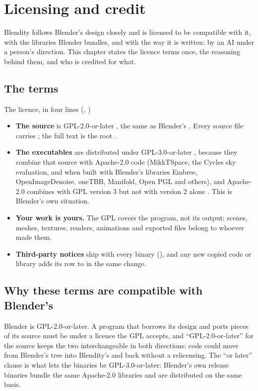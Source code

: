 \chapter{Licensing and credit}
\label{ch:licensing}
Blendity follows Blender's design closely and is licensed to be compatible with it, with the libraries Blender bundles,
and with the way it is written: by an AI under a person's direction. This chapter states the licence terms once, the
reasoning behind them, and who is credited for what.

\section{The terms}
\begin{rulebox}{The licence, in four lines (, )}
\begin{itemize}
  \item \textbf{The source} is GPL-2.0-or-later \cite{GPLv2}, the same as Blender's \cite{Blender2026}. Every source file
    carries  \cite{SPDX2024}; the full text is the root .
  \item \textbf{The executables} are distributed under GPL-3.0-or-later \cite{GPLv3}, because they combine that source
    with Apache-2.0 code \cite{Apache2} (MikkTSpace, the Cycles sky evaluation, and when built with Blender's libraries
    Embree, OpenImageDenoise, oneTBB, Manifold, Open PGL and others), and Apache-2.0 combines with GPL version 3 but
    not with version 2 alone \cite{GPLFAQ2026}. This is Blender's own situation.
  \item \textbf{Your work is yours.} The GPL covers the program, not its output: scenes, meshes, textures, renders,
    animations and exported files belong to whoever made them.
  \item \textbf{Third-party notices} ship with every binary (), and any new copied code or library adds
    its row to  in the same change.
\end{itemize}
\end{rulebox}

\section{Why these terms are compatible with Blender's}
Blender is GPL-2.0-or-later. A program that borrows its design and ports pieces of its source must be under a licence
the GPL accepts, and ``GPL-2.0-or-later'' for the source keeps the two interchangeable in both directions: code could
move from Blender's tree into Blendity's and back without a relicensing. The ``or later'' clause is what lets the
binaries be GPL-3.0-or-later: Blender's own release binaries bundle the same Apache-2.0 libraries and are distributed
on the same basis.

